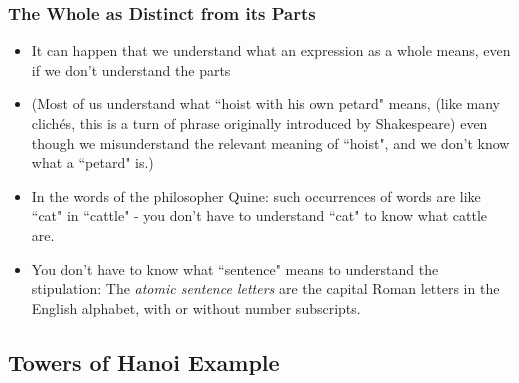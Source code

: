  \begin{frame}
\frametitle{The Whole as Distinct from its Parts}

\begin{itemize}[<+->]
\item 
It can happen that we understand what an expression as a whole means, even if we don't understand the parts

\item (Most of us understand what ``hoist with his own petard" means, (like many clich\'es, this is a turn of phrase originally introduced by Shakespeare) even though we misunderstand the relevant meaning of ``hoist", and we don't know what a ``petard" is.)


\item In the words of the philosopher Quine: such occurrences of words are like ``cat" in ``cattle" - you don't have to understand ``cat" to know what cattle are.

\item  You don't have to know what ``sentence" means to understand the stipulation: The {\it{atomic sentence letters}} are the capital Roman letters in the English alphabet, with or without number subscripts.

\end{itemize} 
\end{frame}




\subsection{Towers of Hanoi Example} 

